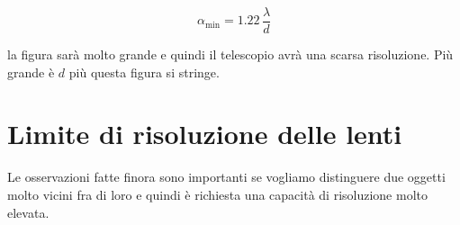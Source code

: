 \[
	\boxed{\alpha_{\text{min}} = 1.22\,\frac{\lambda}{d}}
\]

la figura sarà molto grande e quindi il telescopio avrà una scarsa risoluzione. Più grande è $d$ più questa figura si stringe.

\section{Limite di risoluzione delle lenti}

Le osservazioni fatte finora sono importanti se vogliamo distinguere due oggetti molto vicini fra di loro e quindi è richiesta una capacità di risoluzione molto elevata.

\begin{figure}[htpb]
	\centering


	\begin{tikzpicture}[x=0.75pt,y=0.75pt,yscale=-0.9,xscale=0.9]


\end{tikzpicture}
\end{figure}
